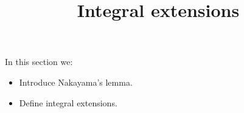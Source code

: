 \documentclass{ximera}
\title{Integral extensions}
\begin{document}
\begin{abstract}
\end{abstract}

\maketitle

In this section we:

\begin{itemize}
\item Introduce Nakayama's lemma.
\item Define integral extensions.
\end{itemize}
\end{document}
